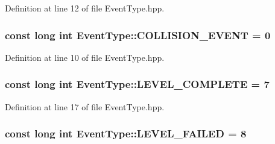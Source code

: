Definition at line 12 of file Event\+Type.\+hpp.

\hypertarget{class_event_type_a096fc66c6f900edf9f3a266c4c981bfa}{
\subsubsection[{C\+O\+L\+L\+I\+S\+I\+O\+N\+\_\+\+E\+V\+E\+N\+T}]{\setlength{\rightskip}{0pt plus 5cm}const long int Event\+Type\+::\+C\+O\+L\+L\+I\+S\+I\+O\+N\+\_\+\+E\+V\+E\+N\+T = 0\hspace{0.3cm}{\ttfamily [static]}}}\label{class_event_type_a096fc66c6f900edf9f3a266c4c981bfa}


Definition at line 10 of file Event\+Type.\+hpp.

\hypertarget{class_event_type_ac2a930a6be10c5029dc2cda396501ed6}{
\subsubsection[{L\+E\+V\+E\+L\+\_\+\+C\+O\+M\+P\+L\+E\+T\+E}]{\setlength{\rightskip}{0pt plus 5cm}const long int Event\+Type\+::\+L\+E\+V\+E\+L\+\_\+\+C\+O\+M\+P\+L\+E\+T\+E = 7\hspace{0.3cm}{\ttfamily [static]}}}\label{class_event_type_ac2a930a6be10c5029dc2cda396501ed6}


Definition at line 17 of file Event\+Type.\+hpp.

\hypertarget{class_event_type_af4489d5bccfbcb7b95afc3ca19940038}{
\subsubsection[{L\+E\+V\+E\+L\+\_\+\+F\+A\+I\+L\+E\+D}]{\setlength{\rightskip}{0pt plus 5cm}const long int Event\+Type\+::\+L\+E\+V\+E\+L\+\_\+\+F\+A\+I\+L\+E\+D = 8\hspace{0.3cm}{\ttfamily [static]}}}\label{class_event_type_af4489d5bccfbcb7b95afc3ca19940038}


